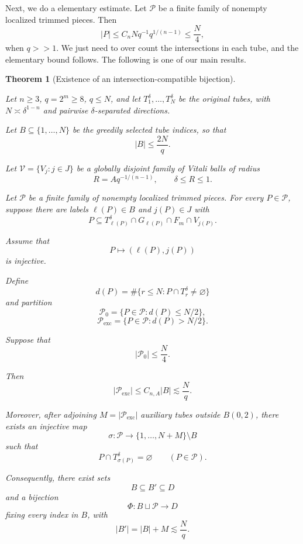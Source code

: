 \documentclass[11pt, letterpaper]{nyjm}
\newtheorem{theorem}{Theorem}[section]
\begin{document}
	Next, we do a elementary estimate. Let $\mathcal P$ be a finite family of nonempty
	localized trimmed pieces. Then 
	\begin{equation} \label{eq:elementary-bound}
		|P| \leq C_nNq^{-1}q^{1/(n-1)} \leq \frac{N}{4},
	\end{equation}
	when $q >> 1.$ We just need to over count the intersections in each tube, and the elementary bound follows. The following is one of our main results. 
	
	\begin{theorem}
		[Existence of an intersection-compatible bijection]
		\label{thm:restricted-bijection}
		
		Let $n\ge3$, $q=2^m\ge8$, $q\le N$,
		and let $T_1^\delta,\ldots,T_N^\delta$
		be the original tubes, with
		$N\asymp\delta^{1-n}$ and pairwise
		$\delta$-separated directions.
		
		Let $B\subseteq\{1,\ldots,N\}$
		be the greedily selected tube indices,
		so that
		\[
		|B|\le\frac{2N}{q}.
		\]
		
		Let $\mathcal V=\{V_j:j\in J\}$
		be a globally disjoint family of
		Vitali balls of radius
		\[
		R=Aq^{-1/(n-1)},\qquad
		\delta\le R\le1.
		\]
		
		Let $\mathcal P$ be a finite family
		of nonempty localized trimmed pieces.
		For every $P\in\mathcal P$, suppose
		there are labels
		$\ell(P)\in B$ and $j(P)\in J$ with
		\[
		P\subseteq
		T_{\ell(P)}^\delta
		\cap G_{\ell(P)}
		\cap F_m\cap V_{j(P)}.
		\]
		
		Assume that
		\[
		P\longmapsto(\ell(P),j(P))
		\]
		is injective.
		
		Define
		\[
		d(P)=
		\#\{r\le N:P\cap T_r^\delta
		\ne\varnothing\}
		\]
		and partition
		\[
		\mathcal P_0=
		\{P\in\mathcal P:d(P)\le N/2\},
		\]
		\[
		\mathcal P_{\mathrm{exc}}=
		\{P\in\mathcal P:d(P)>N/2\}.
		\]
		
		Suppose that
		\[
		|\mathcal P_0|\le\frac N4.
		\]
		
		Then
		\[
		|\mathcal P_{\mathrm{exc}}|
		\le C_{n,A}|B|
		\lesssim\frac Nq.
		\]
		
		Moreover, after adjoining
		$M=|\mathcal P_{\mathrm{exc}}|$
		auxiliary tubes outside $B(0,2)$,
		there exists an injective map
		\[
		\sigma:\mathcal P\longrightarrow
		\{1,\ldots,N+M\}\setminus B
		\]
		such that
		\[
		P\cap T_{\sigma(P)}^\delta
		=\varnothing
		\qquad(P\in\mathcal P).
		\]
		
		Consequently, there exist sets
		\[
		B\subseteq B'\subseteq D
		\]
		and a bijection
		\[
		\Phi:B\sqcup\mathcal P\longrightarrow D
		\]
		fixing every index in $B$, with
		\[
		|B'|=|B|+M
		\lesssim\frac Nq.
		\]
	\end{theorem}
	
\end{document}
